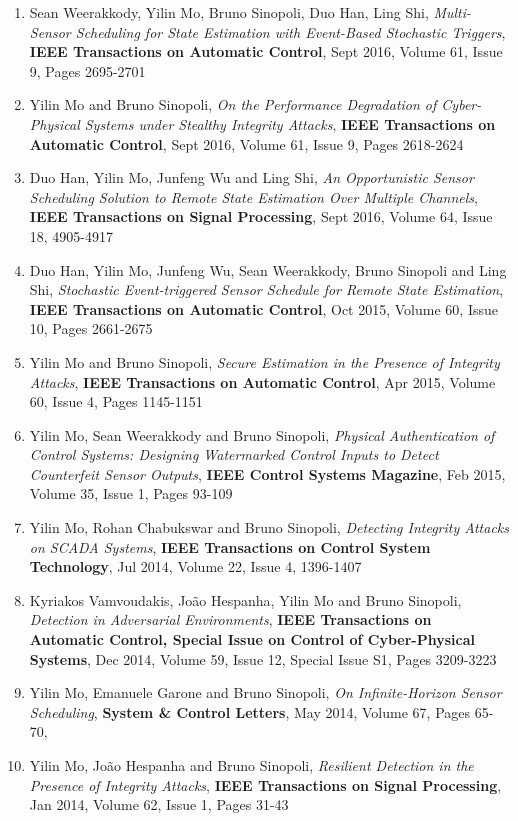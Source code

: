 \documentclass[10pt, a4paper]{article}
\begin{document}
\begin{enumerate}
\item Sean Weerakkody, Yilin Mo, Bruno Sinopoli, Duo Han, Ling Shi, \emph{Multi-Sensor Scheduling for State Estimation with Event-Based Stochastic Triggers}, \textbf{IEEE Transactions on Automatic Control}, Sept 2016, Volume 61, Issue 9, Pages 2695-2701
\item Yilin Mo and Bruno Sinopoli, {\emph{On the Performance Degradation of Cyber-Physical Systems under Stealthy Integrity Attacks}}, \textbf{IEEE Transactions on Automatic Control}, Sept 2016, Volume 61, Issue 9, Pages 2618-2624
\item Duo Han, Yilin Mo, Junfeng Wu and Ling Shi, \emph{An Opportunistic Sensor Scheduling Solution to Remote State Estimation Over Multiple Channels}, \textbf{IEEE Transactions on Signal Processing}, Sept 2016, Volume 64, Issue 18, 4905-4917
\item Duo Han, Yilin Mo, Junfeng Wu, Sean Weerakkody, Bruno Sinopoli and Ling Shi, {\emph{Stochastic Event-triggered Sensor Schedule for Remote State Estimation}}, \textbf{IEEE Transactions on Automatic Control}, Oct 2015, Volume 60, Issue 10, Pages 2661-2675
\item Yilin Mo and Bruno Sinopoli, \emph{{Secure Estimation in the Presence of Integrity Attacks}}, \textbf{IEEE Transactions on Automatic Control}, Apr 2015, Volume 60, Issue 4, Pages 1145-1151
\item Yilin Mo, Sean Weerakkody and Bruno Sinopoli, \emph{{Physical Authentication of Control Systems: Designing Watermarked Control Inputs to Detect Counterfeit Sensor Outputs}}, \textbf{IEEE Control Systems Magazine}, Feb 2015, Volume 35, Issue 1, Pages 93-109
\item Yilin Mo, Rohan Chabukswar and Bruno Sinopoli, \emph{{Detecting Integrity Attacks on SCADA Systems}}, \textbf{IEEE Transactions on Control System Technology}, Jul 2014, Volume 22, Issue 4, 1396-1407
\item Kyriakos Vamvoudakis, Jo\~{a}o Hespanha, Yilin Mo and Bruno Sinopoli, \emph{{Detection in Adversarial Environments}}, \textbf{IEEE Transactions on Automatic Control, Special Issue on Control of Cyber-Physical Systems}, Dec 2014, Volume 59, Issue 12, Special Issue S1, Pages 3209-3223
\item Yilin Mo, Emanuele Garone and Bruno Sinopoli, \emph{{On Infinite-Horizon Sensor Scheduling}}, \textbf{System \& Control Letters}, May 2014, Volume 67, Pages 65-70,
\item Yilin Mo, Jo\~{a}o Hespanha and Bruno Sinopoli, \emph{{Resilient Detection in the Presence of Integrity Attacks}}, \textbf{IEEE Transactions on Signal Processing}, Jan 2014, Volume 62, Issue 1, Pages 31-43

\end{enumerate}
\end{document}
